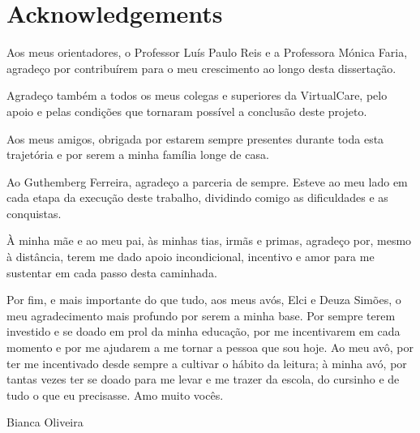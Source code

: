 \chapter*{Acknowledgements}

Aos meus orientadores, o Professor Luís Paulo Reis e a Professora Mónica Faria, agradeço por contribuírem para o meu crescimento ao longo desta dissertação.

Agradeço também a todos os meus colegas e superiores da VirtualCare, pelo apoio e pelas condições que tornaram possível a conclusão deste projeto.

Aos meus amigos, obrigada por estarem sempre presentes durante toda esta trajetória e por serem a minha família longe de casa.

Ao Guthemberg Ferreira, agradeço a parceria de sempre. Esteve ao meu lado em cada etapa da execução deste trabalho, dividindo comigo as dificuldades e as conquistas.

À minha mãe e ao meu pai, às minhas tias, irmãs e primas, agradeço por, mesmo à distância, terem me dado apoio incondicional, incentivo e amor para me sustentar em cada passo desta caminhada.

Por fim, e mais importante do que tudo, aos meus avós, Elci e Deuza Simões, o meu agradecimento mais profundo por serem a minha base. Por sempre terem investido e se doado em prol da minha educação, por me incentivarem em cada momento e por me ajudarem a me tornar a pessoa que sou hoje. Ao meu avô, por ter me incentivado desde sempre a cultivar o hábito da leitura; à minha avó, por tantas vezes ter se doado para me levar e me trazer da escola, do cursinho e de tudo o que eu precisasse. Amo muito vocês.

\vspace{10mm}
\begin{flushleft}
Bianca Oliveira
\end{flushleft}
